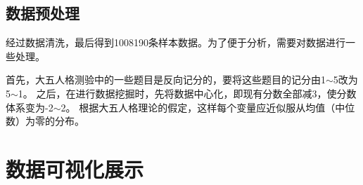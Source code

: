 \documentclass[UTF8]{ctexart}
\begin{document}
      \subsection*{数据预处理}
        经过数据清洗，最后得到1008190条样本数据。为了便于分析，需要对数据进行一些处理。\par
        首先，大五人格测验中的一些题目是反向记分的，要将这些题目的记分由1$\sim$5改为5$\sim$1。
        之后，在进行数据挖掘时，先将数据中心化，即现有分数全部减3，使分数体系变为-2$\sim$2。
        根据大五人格理论的假定，这样每个变量应近似服从均值（中位数）为零的分布。
    \section{数据可视化展示}
\end{document}
